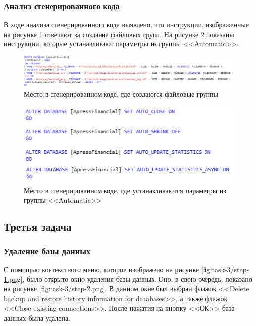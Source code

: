 \documentclass[a4paper, 14pt]{extarticle}
\begin{document}
\subsubsection{Анализ сгенерированного кода}

В ходе анализа сгенерированного кода выявлено, что инструкции, изображенные на
рисунке \ref{fig:task-2/step-3.png} отвечают за создание файловых групп. На
рисунке \ref{fig:task-2/step-4.png} показаны инструкции, которые устанавливают
параметры из группы <<Automatic>>.

\begin{figure}[H]
  \centering
  \includegraphics[width=\textwidth]{images/task-2/step-3.png}
  \caption{Место в сгенерированном коде, где создаются файловые группы}
  \label{fig:task-2/step-3.png}
\end{figure}

\begin{figure}[H]
  \centering
  \includegraphics[width=\textwidth]{images/task-2/step-4.png}
  \caption{
    Место в сгенерированном коде, где устанавливаются параметры из группы
    <<Automatic>>
  }
  \label{fig:task-2/step-4.png}
\end{figure}

\subsection{Третья задача}

\subsubsection{Удаление базы данных}

С помощью контекстного меню, которое изображено на рисунке
\ref{fig:task-3/step-1.png}, было открыто окно удаления базы данных. Оно, в свою
очередь, показано на рисунке \ref{fig:task-3/step-2.png}. В данном окне был
выбран флажок <<Delete backup and restore history information for databases>>, а
также флажок <<Close existing connections>>. После нажатия на кнопку <<ОК>> база
данных была удалена.
\end{document}
